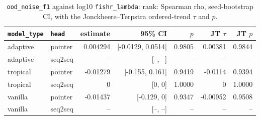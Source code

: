 \documentclass[10pt]{article}
\begin{document}
{\small
\begin{longtable}{llrrrrr}
\caption{\texttt{ood\_noise\_f1} against log10 \texttt{fishr\_lambda}: rank: Spearman rho, seed-bootstrap CI, with the Jonckheere--Terpstra ordered-trend $\tau$ and $p$.}\label{tab:trend-ood_noise_f1}\\
\toprule
\texttt{model\_type} & \texttt{head} & estimate & 95\% CI & $p$ & JT $\tau$ & JT $p$\\
\midrule
\endhead
adaptive & pointer & 0.004294 & [-0.0129, 0.0514] & 0.9805 & 0.00381 & 0.9844\\
adaptive & seq2seq & -- & [--, --] & -- & -- & --\\
tropical & pointer & -0.01279 & [-0.155, 0.161] & 0.9419 & -0.0114 & 0.9394\\
tropical & seq2seq & 0 & [0, 0] & 1.0000 & 0 & 1.0000\\
vanilla & pointer & -0.01437 & [-0.129, 0] & 0.9347 & -0.00952 & 0.9508\\
vanilla & seq2seq & -- & [--, --] & -- & -- & --\\
\bottomrule
\end{longtable}
}
\end{document}
